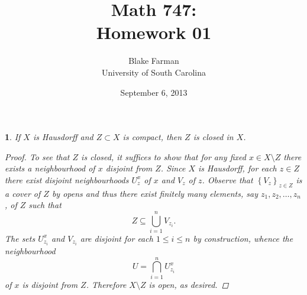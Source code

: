\documentclass[10pt]{amsart}
\author{Blake Farman\\University of South Carolina}
\title{Math 747:\\Homework 01}
\date{September 6, 2013}
\begin{document}
\maketitle

\providecommand{\p}{\mathfrak{p}}
\providecommand{\m}{\mathfrak{m}}

\newtheorem{thm}{}
\newtheorem{lem}{Lemma}

\begin{thm}\label{ex1}
  If $X$ is Hausdorff and $Z \subset X$ is compact, then $Z$ is closed in $X$.
  
  \begin{proof}
    To see that $Z$ is closed, it suffices to show that for any fixed $x \in X \setminus Z$ there exists a neighbourhood of $x$ disjoint from $Z$.
    Since $X$ is Hausdorff, for each $z \in Z$ there exist disjoint neighbourhoods $U_z^{x}$ of $x$ and $V_z$ of $z$.
    Observe that $\left\{V_z\right\}_{z \in Z}$ is a cover of $Z$ by opens and thus there exist finitely many elements, say $z_1, z_2, \ldots, z_n$, of $Z$ such that
    $$Z \subseteq \bigcup_{i = 1}^n V_{z_i}.$$
    The sets $U_{z_i}^x$ and $V_{z_i}$ are disjoint for each $1 \leq i \leq n$ by construction, whence the neighbourhood
    $$U = \bigcap_{i = 1}^n U_{z_i}^x$$
    of $x$ is disjoint from $Z$.
    Therefore $X \setminus Z$ is open, as desired.
  \end{proof}
\end{thm}
\end{document}
